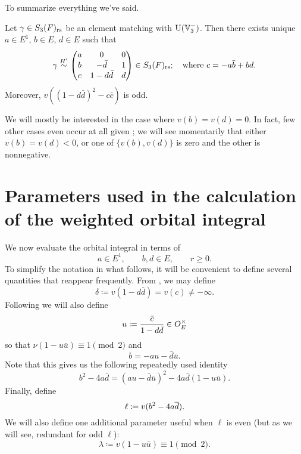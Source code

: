 To summarize everything we've said.
\begin{lemma}
  \label{lem:S3_abcd}
  Let $\gamma \in S_3(F)_{\mathrm{rs}}$ be an element matching with $\operatorname{U}(\mathbb V_3^-)$.
  Then there exists unique $a \in E^1$, $b \in E$, $d \in E$ such that
  \[ \gamma \overset{H'}{\sim}
    \begin{pmatrix}
      a & 0 & 0 \\
      b & - \bar d & 1 \\
      c & 1 - d \bar d & d
    \end{pmatrix}
    \in S_3(F)_{\mathrm{rs}}; \quad \text{where $c = -a \bar b + b d$}. \]
  Moreover, $v\left( (1-d \bar d)^2 - c \bar c \right)$ is odd.
\end{lemma}

We will mostly be interested in the case where $v(b) = v(d) = 0$.
In fact, few other cases even occur at all given ;
we will see momentarily that either $v(b) = v(d) < 0$,
or one of $\{v(b), v(d)\}$ is zero and the other is nonnegative.

\section{Parameters used in the calculation of the weighted orbital integral}
\label{sec:param_orbital0}

We now evaluate the orbital integral in terms of
\[ a \in E^1, \qquad b, d \in E, \qquad r \ge 0. \]
To simplify the notation in what follows,
it will be convenient to define several quantities that reappear frequently.
From , we may define
\begin{equation}
  \delta \coloneqq v(1-d \bar d) = v(c) \neq -\infty.
  \label{eq:delta}
\end{equation}
Following \cite[Equation (4.3)]{ref:AFL} we will also define
\begin{equation}
  u \coloneqq \frac{\bar c}{1-d \bar d} \in O_E^\times
  \label{eq:u}
\end{equation}
so that $\nu(1-u \bar u) \equiv 1 \pmod 2$ and
\begin{equation}
  b = -au - \bar{d} \bar{u}.
  \label{eq:b}
\end{equation}
Note that this gives us the following repeatedly used identity
\begin{equation}
  b^2-4a\bar d = (au-\bar d \bar u)^2 - 4a\bar d(1-u\bar u).
  \label{eq:dos}
\end{equation}
Finally, define
\begin{equation}
  \ell \coloneqq v(b^2 - 4 a \overline d).
  \label{eq:ell}
\end{equation}
We will also define one additional parameter useful when $\ell$ is even
(but as we will see, redundant for odd $\ell$):
\begin{equation}
  \lambda \coloneqq v(1-u \bar u) \equiv 1 \pmod 2.
  \label{eq:lambda}
\end{equation}

